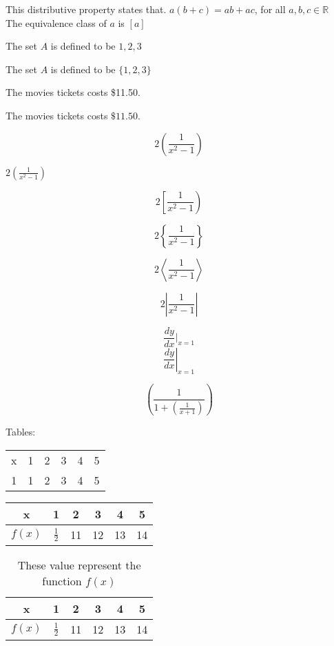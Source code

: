 \documentclass[11pt]{article}
\begin{document}
This distributive property states that.
$a(b+c) = ab + ac$, for all $a,b,c \in \mathbb{R}$\\[6pt]
The equivalence class of $a$ is $[a]$

The set $A$ is defined to be ${1,2,3}$

The set $A$ is defined to be $\{1,2,3\}$

The movies tickets costs \$11.50.

The movies tickets costs $\$11.50$.

$$2(\frac{1}{x^2-1})$$

$2(\frac{1}{x^2-1})$

$$2\left[\frac{1}{x^2-1}\right)$$
 
$$2\left\{\frac{1}{x^2-1}\right\}$$

$$2\left\langle\frac{1}{x^2-1}\right\rangle$$

$$2\left|\frac{1}{x^2-1}\right|$$

$$\frac{dy}{dx}|_{x=1}$$
$$\left.\frac{dy}{dx}\right|_{x=1}$$

$$\left(\frac{1}{1+\left(\frac{1}{x+1}\right)}\right)$$

Tables:\\
\begin{tabular}{cccccc}
x &1 & 2 & 3 & 4 & 5\\
1 &1 & 2 & 3 & 4 & 5\\
\end{tabular}

\vspace{1cm}

\begin{tabular}{|c||c|c|c|c|c|}
\hline
x &1 & 2 & 3 & 4 & 5\\ \hline
$f(x)$ & $\frac{1}{2}$ & 11 & 12 & 13 & 14\\\hline
\end{tabular}

\begin{table}[H]
\centering
\def\arraystretch{2}

\begin{tabular}{|c||c|c|c|c|c|}
\hline
x &1 & 2 & 3 & 4 & 5\\ \hline
$f(x)$ & $\frac{1}{2}$ & 11 & 12 & 13 & 14\\\hline
\end{tabular}
\caption{These value represent the function $f(x)$}
\end{table}
\end{document}
